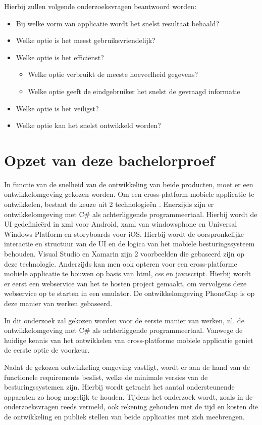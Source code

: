 Hierbij zullen volgende onderzoeksvragen beantwoord worden:
\begin{itemize}
  \item{Bij welke vorm van applicatie wordt het snelst resultaat behaald?}
  \item{Welke optie is het meest gebruiksvriendelijk?}
  \item{Welke optie is het efficiënst?}
  \begin{itemize}
    \item{Welke optie verbruikt de meeste hoeveelheid gegevens?}
    \item{Welke optie geeft de eindgebruiker het snelst de gevraagd informatie}
  \end{itemize}
  \item{Welke optie is het veiligst?}
  \item{Welke optie kan het snelst ontwikkeld worden?}
\end{itemize}
\newpage
\section{Opzet van deze bachelorproef}
\label{sec:opzet-bachelorproef}

In functie van de snelheid van de ontwikkeling van beide producten, moet er een ontwikkelomgeving gekozen worden.
Om een cross-platform mobiele applicatie te ontwikkelen, bestaat de keuze uit 2 technologieën . Enerzijds zijn er
ontwikkelomgeving met C\# als achterliggende programmeertaal. Hierbij wordt de UI gedefinieërd in xml voor Android,
xaml van windowsphone en Universal Windows Platform en storyboards voor iOS. Hierbij wordt de oorspronkelijke interactie
en structuur van de UI en de logica van het mobiele besturingssysteem behouden. Visual Studio en Xamarin zijn 2 voorbeelden
die gebaseerd zijn op deze technologie. Anderzijds kan men ook opteren voor een cross-platforme mobiele applicatie te bouwen op basis van html, css en javascript.
Hierbij wordt er eerst een webservice van het te hosten project gemaakt, om vervolgens deze webservice op te starten in een emulator.
De ontwikkelomgeving PhoneGap is op deze manier van werken gebaseerd.

In dit onderzoek zal gekozen worden voor de eerste manier van werken, nl. de ontwikkelomgeving met C\# als achterliggende
programmeertaal. Vanwege de huidige kennis van het ontwikkelen van cross-platforme mobiele applicatie geniet de eerste optie de voorkeur.

Nadat de gekozen ontwikkeling omgeving vastligt, wordt er aan de hand van de functionele requirements  beslist, welke de
minimale versies van de besturingssystemen zijn. Hierbij wordt getracht het aantal ondersteunende apparaten zo hoog mogelijk te houden.
Tijdens het onderzoek wordt, zoals in de onderzoeksvragen reeds vermeld, ook rekening gehouden met de tijd en kosten die de ontwikkeling
en publiek stellen van beide applicaties met zich meebrengen.

